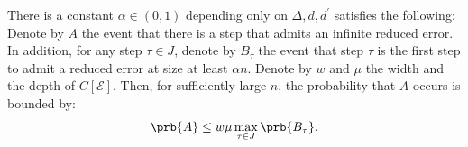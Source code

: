 \begin{claim}
  \label{claim:intersyn}
  There is a constant $\alpha \in (0,1)$ depending only on $\Delta,d,d^{\prime}$ satisfies the following: Denote by $A$ the event that there is a step that admits an infinite reduced error. In addition, for any step $\tau \in J$, denote by $B_{\tau}$ the event that step $\tau$ is the first step to admit a reduced error at size at least $\alpha n$. Denote by $w$ and $\mu$ the width and the depth of $C[\mathcal{E}]$. Then, for sufficiently large $n$, the probability that $A$ occurs is bounded by:
  \begin{equation*}
    \begin{split}
      \prb{A} \le w\mu\max_{\tau\in J }\prb{B_{\tau}}.
    \end{split}
  \end{equation*}
\end{claim}


